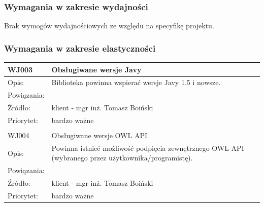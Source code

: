 \subsubsection{Wymagania w zakresie wydajności}


Brak wymogów wydajnościowych ze względu na specyfikę projektu.





\subsubsection{Wymagania w zakresie elastyczności}


\begin{center}

\begin{tabular}{|m{3cm}|m{9cm}|} \hline

WJ003 & Obsługiwane wersje Javy \\ \hline
Opis: & Biblioteka powinna wspierać wersje Javy 1.5 i nowsze.\\ \hline
Powiązania: &  \\ \hline
Źródło: & klient - mgr inż. Tomasz Boiński \\ \hline
Priorytet: & bardzo ważne \\ \hline

\multicolumn{2}{c}{} \\
 \hline

WJ004 & Obsługiwane wersje OWL API \\ \hline
Opis: & Powinna istnieć możliwość podpięcia zewnętrznego OWL API (wybranego przez użytkownika/programistę).\\ \hline
Powiązania: &  \\ \hline
Źródło: & klient - mgr inż. Tomasz Boiński \\ \hline
Priorytet: & bardzo ważne \\ \hline

\end{tabular}

\end{center}

